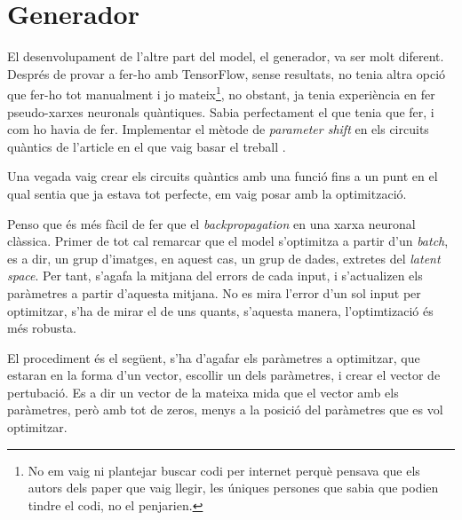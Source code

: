 \section{Generador}

El desenvolupament de l'altre part del model, el generador, va ser molt diferent. Després de provar a fer-ho amb TensorFlow, sense resultats, no tenia altra opció que fer-ho tot manualment i jo mateix\footnote{No em vaig ni plantejar buscar codi per internet perquè pensava que els autors dels paper que vaig llegir, les úniques persones que sabia que podien tindre el codi, no el penjarien.}, no obstant, ja tenia experiència en fer pseudo-xarxes neuronals quàntiques. Sabia perfectament el que tenia que fer, i com ho havia de fer. Implementar el mètode de \textit{parameter shift} en els circuits quàntics de l'article en el que vaig basar el treball \cite{QGAN_exp}. 

Una vegada vaig crear els circuits quàntics amb una funció fins a un punt en el qual sentia que ja estava tot perfecte, em vaig posar amb la optimització. 

Penso que és més fàcil de fer que el \textit{backpropagation} en una xarxa neuronal clàssica. 
Primer de tot cal remarcar que el model s'optimitza a partir d'un \textit{batch}, es a dir, un grup d'imatges, en aquest cas, un grup de dades, extretes del \textit{latent space}. Per tant, s'agafa la mitjana del errors de cada input, i s'actualizen els paràmetres a partir d'aquesta mitjana. No es mira l'error d'un sol input per optimitzar, s'ha de mirar el de uns quants, s'aquesta manera, l'optimtizació és més robusta. 

El procediment és el següent, s'ha d'agafar els paràmetres a optimitzar, que estaran en la forma d'un vector, escollir un dels paràmetres, i crear el vector de pertubació. Es a dir un vector de la mateixa mida que el vector amb els paràmetres, però amb tot de zeros, menys a la posició del paràmetres que es vol optimitzar. 

